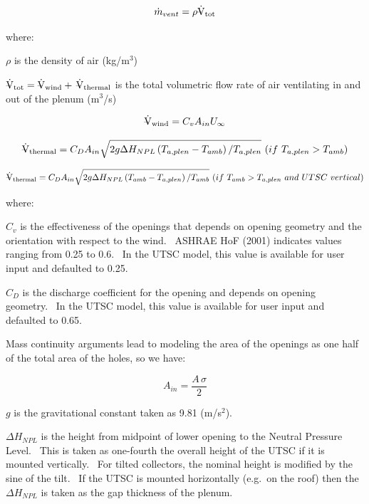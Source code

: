 \begin{equation}
{\dot m_{vent}} = \rho {{\rm{\rlap{--} \dot V}}_{{\rm{tot}}}}
\end{equation}

where:

\(\rho\) is the density of air (kg/m\(^{3}\))

\({{\rm{\rlap{--} \dot V}}_{{\rm{tot}}}} = {{\rm{\rlap{--} \dot V}}_{{\rm{wind}}}} + \,{{\rm{\rlap{--} \dot V}}_{{\rm{thermal}}}}\) is the total volumetric flow rate of air ventilating in and out of the plenum (m\(^{3}\)/s)

\begin{equation}
{{\rm{\rlap{--} \dot V}}_{{\rm{wind}}}} = {C_v}{A_{in}}{U_\infty }
\end{equation}

\begin{equation}
{{\rm{\rlap{--} \dot V}}_{{\rm{thermal}}}} = {C_D}{A_{in}}\sqrt {2g\Delta {H_{NPL}}\left( {{T_{a,plen}} - {T_{amb}}} \right)/{T_{a,plen}}} ~ (if~{T_{a,plen}} > {T_{amb}} )
\end{equation}

\begin{equation}
{{\rm{\rlap{--} \dot V}}_{{\rm{thermal}}}} = {C_D}{A_{in}}\sqrt {2g\Delta {H_{NPL}}\left( {{T_{amb}} - {T_{a,plen}}} \right)/{T_{amb}}} ~ (if~{T_{amb}} > {T_{a,plen}} ~ and~UTSC~vertical)
\end{equation}

where:

\({C_v}\) is the effectiveness of the openings that depends on opening geometry and the orientation with respect to the wind.~ ASHRAE HoF (2001) indicates values ranging from 0.25 to 0.6.~ In the UTSC model, this value is available for user input and defaulted to 0.25.

\({C_D}\) is the discharge coefficient for the opening and depends on opening geometry.~ In the UTSC model, this value is available for user input and defaulted to 0.65.

Mass continuity arguments lead to modeling the area of the openings as one half of the total area of the holes, so we have:

\begin{equation}
{A_{in}} = \frac{{A\,\sigma }}{2}
\end{equation}

\(g\) is the gravitational constant taken as 9.81 (m/s\(^{2}\)).

\(\Delta {H_{NPL}}\) is the height from midpoint of lower opening to the Neutral Pressure Level.~ This is taken as one-fourth the overall height of the UTSC if it is mounted vertically.~ For tilted collectors, the nominal height is modified by the sine of the tilt.~ If the UTSC is mounted horizontally (e.g.~on the roof) then the \(\Delta {H_{NPL}}\) is taken as the gap thickness of the plenum.

